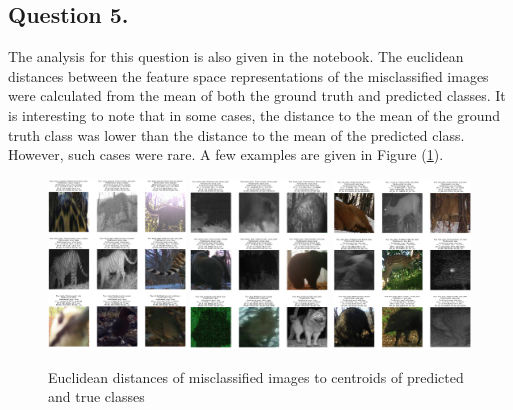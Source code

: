 \documentclass[10pt]{article}
\begin{document}
    \subsection*{\textbf{Question 5.}}
    The analysis for this question is also given in the notebook. The euclidean distances
    between the feature space representations of the misclassified images were calculated
    from the mean of both the ground truth and predicted classes. It is interesting to note
    that in some cases, the distance to the mean of the ground truth class was lower than
    the distance to the mean of the predicted class. However, such cases were rare.
    A few examples are given in Figure (\ref{fig:dists}).
    \begin{figure}[h!]
        \centering
        \includegraphics[width=0.325\textwidth]{Assets/Classification/Convnet/Misclassifications/04}
        \includegraphics[width=0.325\textwidth]{Assets/Classification/Convnet/Misclassifications/05}
        \includegraphics[width=0.325\textwidth]{Assets/Classification/Convnet/Misclassifications/06}
        \caption{Euclidean distances of misclassified images to centroids of predicted and true classes}
        \label{fig:dists}
    \end{figure}
\end{document}
